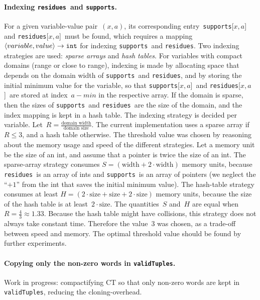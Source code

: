 \documentclass[a4paper,11pt]{article}
\newcommand{\Todo}[1]{{\color{blue}#1}}
\newcommand{\CurrTable}{\texttt{validTuples}}
\newcommand{\Supports}{\texttt{supports}}
\newcommand{\Residues}{\texttt{residues}}
\numberwithin{equation}{section}
\begin{document}
\paragraph{Indexing \Residues~and \Supports.}
For a given variable-value pair~$(x,a)$, its corresponding entry~\Supports[$x,a$]
and \Residues[$x,a$]~must be found, which requires a mapping
$\left\langle variable,value\right\rangle \to \texttt{int}$ for indexing \Supports~and \Residues.
Two indexing strategies are used: \emph{sparse arrays} and \emph{hash tables}.
For variables with compact domains (range or close to range),
indexing is made by allocating space that depends on the domain width of
\Supports~and \Residues, and by storing the initial minimum value for the variable,
so that \Supports[$x,a$]~and \Residues[$x,a$]~are stored at index~$a - min$ in
the respective array. If the domain is sparse,
then the sizes of \Supports~and \Residues~are the size of the domain, and the index mapping
is kept in a hash table.
The indexing strategy is decided per variable.
Let~$R = \frac{\text{domain width}}{\text{domain size}}$.
The current implementation uses a sparse array if~$R \leq 3$, and a hash table
otherwise.
The threshold value was chosen by reasoning about the memory usage and speed
of the different strategies.
Let a memory unit be the size of an int, and assume that a pointer is twice
the size of an int. The sparse-array 
strategy consumes $S = (\text{width} + 2 \cdot \text{width})$ memory units,
because \Residues~is an array of ints and \Supports~is an array of pointers
(we neglect the ``$+1$'' from the int that saves the initial minimum value).
The hash-table strategy consumes at least
$H = (2 \cdot \text{size} + \text{size} + 2 \cdot \text{size})$
memory units, because the size of the hash table 
is at least~$2 \cdot \text{size}$.
The quantities~$S$ and~$H$ are equal when~$R = \frac{4}{3} \approx 1.33$.
Because the hash table might have collisions, this strategy does not always
take constant time. Therefore the value~$3$ was chosen, as a trade-off between
speed and memory. The optimal threshold value should be found by further
experiments.

\paragraph{Copying only the non-zero words in \CurrTable.}
\Todo{Work in progress: compactifying CT so that only non-zero words are kept
  in \CurrTable, reducing the cloning-overhead.}
\end{document}
